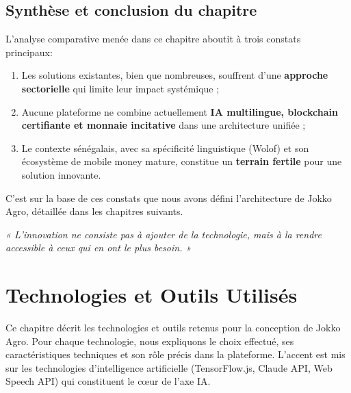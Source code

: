 \documentclass[12pt,a4paper]{report}
\begin{document}
\vspace{0.5cm}

\section{Synthèse et conclusion du chapitre}

\noindent
L'analyse comparative menée dans ce chapitre aboutit à trois constats principaux:

\begin{enumerate}
  \item Les solutions existantes, bien que nombreuses, souffrent d'une \textbf{approche
          sectorielle} qui limite leur impact systémique ;
  \item Aucune plateforme ne combine actuellement \textbf{IA multilingue, blockchain
          certifiante et monnaie incitative} dans une architecture unifiée ;
  \item Le contexte sénégalais, avec sa spécificité linguistique (Wolof) et son
        écosystème de mobile money mature, constitue un \textbf{terrain fertile} pour
        une solution innovante.
\end{enumerate}

\noindent
C'est sur la base de ces constats que nous avons défini l'architecture de Jokko Agro,
détaillée dans les chapitres suivants.

\vspace{0.5cm}
\begin{flushright}
  \textit{« L'innovation ne consiste pas à ajouter de la technologie,
    mais à la rendre accessible à ceux qui en ont le plus besoin. »}
\end{flushright}

\chapter{Technologies et Outils Utilisés}

\begin{tcolorbox}[chapterbox,title={Vue d'ensemble du chapitre}]
  Ce chapitre décrit les technologies et outils retenus pour la conception de Jokko Agro.
  Pour chaque technologie, nous expliquons le choix effectué, ses caractéristiques
  techniques et son rôle précis dans la plateforme. L'accent est mis sur les technologies
  d'intelligence artificielle (TensorFlow.js, Claude API, Web Speech API) qui constituent
  le cœur de l'axe IA.
\end{tcolorbox}
\end{document}
